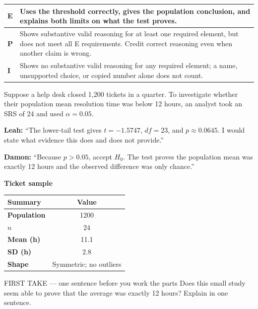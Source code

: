 \documentclass[11pt]{article}
\begin{document}
{\small\renewcommand{\arraystretch}{1.25}
\noindent\begin{tabular}{|p{0.5in}|p{5.9in}|}
\hline
\textbf{E} & Uses the threshold correctly, gives the population conclusion, and explains both limits on what the test proves. \\ \hline
\textbf{P} & Shows substantive valid reasoning for at least one required element, but does not meet all E requirements. Credit correct reasoning even when another claim is wrong. \\ \hline
\textbf{I} & Shows no substantive valid reasoning for any required element; a name, unsupported choice, or copied number alone does not count. \\ \hline
\end{tabular}}

\clearpage
{}

Suppose a help desk closed 1,200 tickets in a quarter. To investigate whether their population mean resolution time was below 12 hours, an analyst took an SRS of 24 and used $\alpha=0.05$.\par\smallskip \textbf{Leah:} ``The lower-tail test gives $t=-1.5747$, $df=23$, and $p\approx0.0645$. I would state what evidence this does and does not provide.''\par \textbf{Damon:} ``Because $p>0.05$, accept $H_0$. The test proves the population mean was exactly 12 hours and the observed difference was only chance.''\par
\begin{center}
\textbf{Ticket sample}\par\smallskip
\begin{tabular}{|l|c|}
\hline
\textbf{Summary} & \textbf{Value} \\ \hline
\textbf{Population} & 1200 \\ \hline
\textbf{$n$} & 24 \\ \hline
\textbf{Mean (h)} & 11.1 \\ \hline
\textbf{SD (h)} & 2.8 \\ \hline
\textbf{Shape} & Symmetric; no outliers \\ \hline
\end{tabular}
\end{center}
\begin{firsttakebox}{FIRST TAKE --- one sentence before you work the parts}
Does this small study seem able to prove that the average was exactly 12 hours? Explain in one sentence.\par
{}
\end{firsttakebox}
\end{document}
